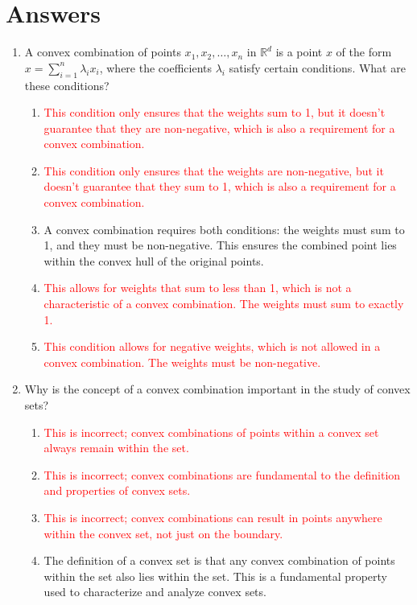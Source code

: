 \documentclass{article}%
\newcommand{\incorrect}[1]{\textcolor{red}{#1}}
\begin{document}
%
\newpage%
\section{Answers}%
\label{sec:Answers}%
\begin{enumerate}%
\item A convex combination of points $x_1, x_2, \dots, x_n$ in $\mathbb{R}^d$ is a point $x$ of the form $x = \sum_{i=1}^n \lambda_i x_i$, where the coefficients $\lambda_i$ satisfy certain conditions. What are these conditions?%
\begin{enumerate}%
\item \incorrect{This condition only ensures that the weights sum to 1, but it doesn't guarantee that they are non-negative, which is also a requirement for a convex combination.}%
\item \incorrect{This condition only ensures that the weights are non-negative, but it doesn't guarantee that they sum to 1, which is also a requirement for a convex combination.}%
\item A convex combination requires both conditions: the weights must sum to 1, and they must be non-negative. This ensures the combined point lies within the convex hull of the original points.%
\item \incorrect{This allows for weights that sum to less than 1, which is not a characteristic of a convex combination.  The weights must sum to exactly 1.}%
\item \incorrect{This condition allows for negative weights, which is not allowed in a convex combination. The weights must be non-negative.}%
\end{enumerate}%
\vspace{1em}%
\item Why is the concept of a convex combination important in the study of convex sets?%
\begin{enumerate}%
\item \incorrect{This is incorrect; convex combinations of points within a convex set always remain within the set.}%
\item \incorrect{This is incorrect; convex combinations are fundamental to the definition and properties of convex sets.}%
\item \incorrect{This is incorrect; convex combinations can result in points anywhere within the convex set, not just on the boundary.}%
\item The definition of a convex set is that any convex combination of points within the set also lies within the set. This is a fundamental property used to characterize and analyze convex sets.%

\end{enumerate}
\end{enumerate}
\end{document}
